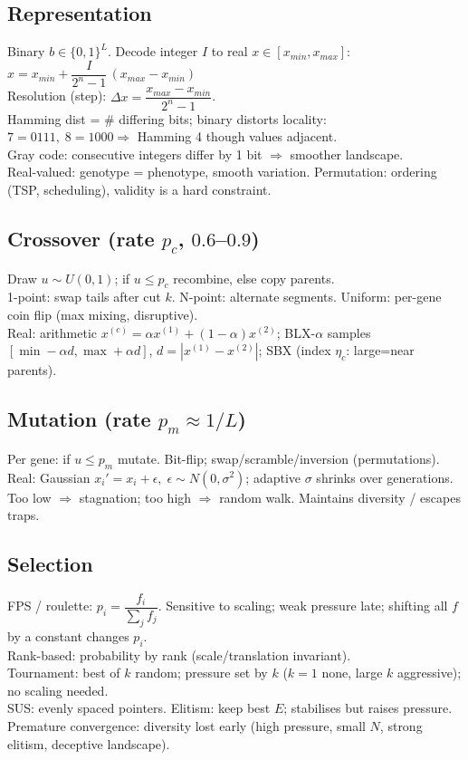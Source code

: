 \subsection*{Representation}
Binary \(b\in\{0,1\}^L\). Decode integer \(I\) to real \(x\in[x_{min},x_{max}]\):\\
\(x=x_{min}+\dfrac{I}{2^n-1}\,(x_{max}-x_{min})\)\\
Resolution (step): \(\Delta x=\dfrac{x_{max}-x_{min}}{2^n-1}\).\\
Hamming dist = \# differing bits; binary distorts locality:\\
\(7=0111,\; 8=1000\Rightarrow\) Hamming 4 though values adjacent.\\
Gray code: consecutive integers differ by 1 bit \(\Rightarrow\) smoother landscape.\\
Real-valued: genotype = phenotype, smooth variation. Permutation: ordering (TSP, scheduling), validity is a hard constraint.

\subsection*{Crossover (rate \(p_c\), \(0.6\)--\(0.9\))}
Draw \( u\sim U(0,1) \); if \( u\le p_c \) recombine, else copy parents.\\
1-point: swap tails after cut \(k\). N-point: alternate segments. Uniform: per-gene coin flip (max mixing, disruptive).\\
Real: arithmetic \( x^{(c)}=\alpha x^{(1)}+(1-\alpha)x^{(2)} \); BLX-\(\alpha\) samples \([\min-\alpha d,\max+\alpha d]\), \(d=|x^{(1)}-x^{(2)}|\); SBX (index \(\eta_c\): large=near parents).

\subsection*{Mutation (rate \(p_m\approx 1/L\))}
Per gene: if \( u\le p_m \) mutate. Bit-flip; swap/scramble/inversion (permutations).\\
Real: Gaussian \( x_i'=x_i+\epsilon,\;\epsilon\sim N(0,\sigma^2) \); adaptive \(\sigma\) shrinks over generations.\\
Too low \(\Rightarrow\) stagnation; too high \(\Rightarrow\) random walk. Maintains diversity / escapes traps.

\subsection*{Selection}
FPS / roulette: \( p_i=\dfrac{f_i}{\sum_j f_j} \). Sensitive to scaling; weak pressure late; shifting all \(f\) by a constant changes \(p_i\).\\
Rank-based: probability by rank (scale/translation invariant).\\
Tournament: best of \(k\) random; pressure set by \(k\) (\(k{=}1\) none, large \(k\) aggressive); no scaling needed.\\
SUS: evenly spaced pointers. Elitism: keep best \(E\); stabilises but raises pressure.\\
Premature convergence: diversity lost early (high pressure, small \(N\), strong elitism, deceptive landscape).

